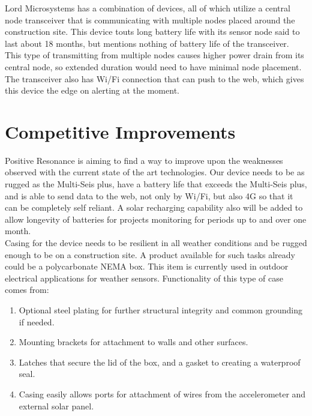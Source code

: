 \documentclass[12pt]{article}
\begin{document}
Lord Microsystems has a combination of devices, all of which utilize a central node transceiver that is communicating with multiple nodes placed around the construction site.  This device touts long battery life with its sensor node said to last about 18 months, but mentions nothing of battery life of the transceiver.  This type of transmitting from multiple nodes causes higher power drain from its central node, so extended duration would need to have minimal node placement. The transceiver also has Wi/Fi connection that can push to the web, which gives this device the edge on alerting at the moment.

\section{Competitive Improvements}

 Positive Resonance is aiming to find a way to improve upon the weaknesses observed with the current state of the art technologies. Our device needs to be as rugged as the Multi-Seis plus, have a battery life that exceeds the Multi-Seis plus, and is able to send data to the web, not only by Wi/Fi, but also 4G so that it can be completely self reliant. A solar recharging capability also will be added to allow longevity of batteries for projects monitoring for periods up to and over one month.\\
 
 Casing for the device needs to be resilient in all weather conditions and be rugged enough to be on a construction site. A product available for such tasks already could be a polycarbonate NEMA box.  This item is currently used in outdoor electrical applications for weather sensors. Functionality of this type of case comes from:
 
 
\begin{enumerate}
	\item Optional steel plating for further structural integrity and common grounding if needed.
	
	\item Mounting brackets for attachment to walls and other surfaces.
	
	\item Latches that secure the lid of the box, and a gasket to creating a waterproof seal.
		
	\item Casing easily allows ports for attachment of wires from the accelerometer and external solar panel.
	
		
\end{enumerate}	
\end{document}
